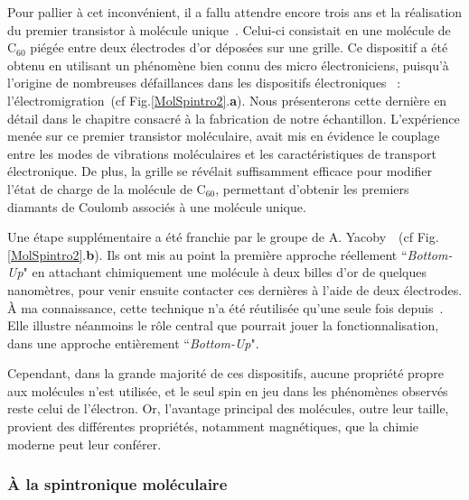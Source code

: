 Pour pallier à cet inconvénient, il a fallu attendre encore trois ans et la réalisation du premier transistor à molécule unique~\cite{Park2000}. Celui-ci consistait en une molécule de C$_{60}$ piégée entre deux électrodes d'or déposées sur une grille. Ce dispositif a été obtenu en utilisant un phénomène bien connu des micro électroniciens, puisqu'à l'origine de nombreuses défaillances dans les dispositifs électroniques~\cite{Ho1989,Tu1992} : l'électromigration~(cf Fig.\ref{MolSpintro2}.\textbf{a}). Nous présenterons cette dernière en détail dans le chapitre consacré à la fabrication de notre échantillon. 
L'expérience menée sur ce premier transistor moléculaire, avait mis en évidence le couplage entre les modes de vibrations moléculaires et les caractéristiques de transport électronique. De plus, la grille se révélait suffisamment efficace pour modifier l'état de charge de la molécule de C$_{60}$, permettant d'obtenir les premiers diamants de Coulomb associés à une molécule unique.

Une étape supplémentaire a été franchie par le groupe de A. Yacoby~\cite{Dadosh2005}~(cf Fig.\ref{MolSpintro2}.\textbf{b}). Ils ont mis au point la première approche réellement ``\textit{Bottom-Up}" en attachant chimiquement une molécule à deux billes d'or de quelques nanomètres, pour venir ensuite contacter ces dernières à l'aide de deux électrodes. \`A ma connaissance, cette technique n'a été réutilisée qu'une seule fois depuis~\cite{Jain2009}. Elle illustre néanmoins le rôle central que pourrait jouer la fonctionnalisation, dans une approche entièrement ``\textit{Bottom-Up}".

Cependant, dans la grande majorité de ces dispositifs, aucune propriété propre aux molécules n'est utilisée, et le seul spin en jeu dans les phénomènes observés reste celui de l'électron. Or, l'avantage principal des molécules, outre leur taille, provient des différentes propriétés, notamment magnétiques, que la chimie moderne peut leur conférer.

\subsubsection*{\`A la spintronique moléculaire}

